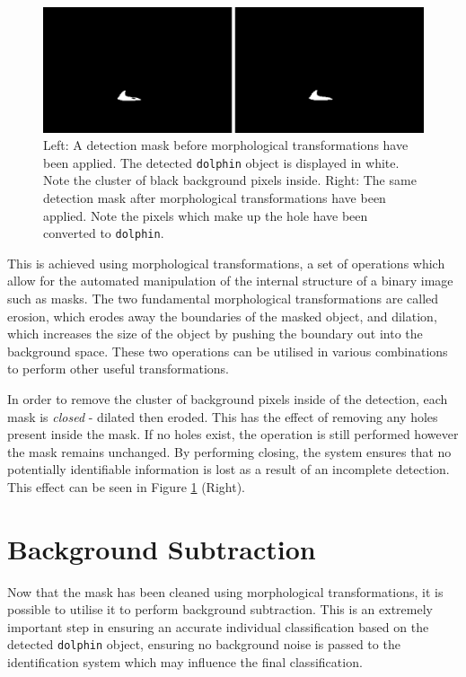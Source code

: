 \begin{figure}[h]
	\begin{center}
		\includegraphics[scale=0.5]{Chapter4/figs/before-and-after-morphing-masks-only.png}
	\end{center}
	\caption{Left: A detection mask before morphological transformations have been applied. The detected \texttt{dolphin} object is displayed in white. Note the cluster of black background pixels inside. Right: The same detection mask after morphological transformations have been applied. Note the pixels which make up the hole have been converted to \texttt{dolphin}.}
	\label{fig:before-and-after-morphing-masks-only}
\end{figure}

This is achieved using morphological transformations, a set of operations which allow for the automated manipulation of the internal structure of a binary image such as masks. The two fundamental morphological transformations are called erosion, which erodes away the boundaries of the masked object, and dilation, which increases the size of the object by pushing the boundary out into the background space. These two operations can be utilised in various combinations to perform other useful transformations.

In order to remove the cluster of background pixels inside of the detection, each mask is \textit{closed} - dilated then eroded. This has the effect of removing any holes present inside the mask. If no holes exist, the operation is still performed however the mask remains unchanged. By performing closing, the system ensures that no potentially identifiable information is lost as a result of an incomplete detection. This effect can be seen in Figure \ref{fig:before-and-after-morphing-masks-only} (Right).

\section{Background Subtraction}\label{ch:postProcessing,sec:bgExtraction}

Now that the mask has been cleaned using morphological transformations, it is possible to utilise it to perform background subtraction. This is an extremely important step in ensuring an accurate individual classification based on the detected \texttt{dolphin} object, ensuring no background noise is passed to the identification system which may influence the final classification.

